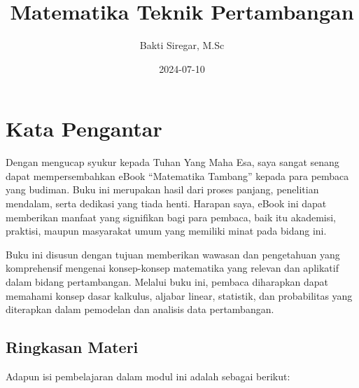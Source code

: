 \documentclass[
]{book}
\title{Matematika Teknik Pertambangan}
\author{Bakti Siregar, M.Sc}
\date{2024-07-10}
\begin{document}
\maketitle

{
\setcounter{tocdepth}{1}
\tableofcontents
}
\chapter*{Kata Pengantar}\label{kata-pengantar}

Dengan mengucap syukur kepada Tuhan Yang Maha Esa, saya sangat senang dapat mempersembahkan eBook ``Matematika Tambang'' kepada para pembaca yang budiman. Buku ini merupakan hasil dari proses panjang, penelitian mendalam, serta dedikasi yang tiada henti. Harapan saya, eBook ini dapat memberikan manfaat yang signifikan bagi para pembaca, baik itu akademisi, praktisi, maupun masyarakat umum yang memiliki minat pada bidang ini.

Buku ini disusun dengan tujuan memberikan wawasan dan pengetahuan yang komprehensif mengenai konsep-konsep matematika yang relevan dan aplikatif dalam bidang pertambangan. Melalui buku ini, pembaca diharapkan dapat memahami konsep dasar kalkulus, aljabar linear, statistik, dan probabilitas yang diterapkan dalam pemodelan dan analisis data pertambangan.

\section*{Ringkasan Materi}\label{ringkasan-materi}

Adapun isi pembelajaran dalam modul ini adalah sebagai berikut:
\end{document}
